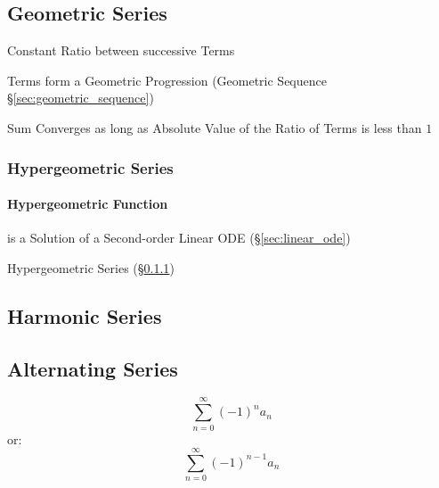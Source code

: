 \subsection{Geometric Series}\label{sec:geometric_series}

Constant Ratio between successive Terms

Terms form a Geometric Progression (Geometric Sequence
\S\ref{sec:geometric_sequence})

Sum Converges as long as Absolute Value of the Ratio of Terms is less
than $1$



\subsubsection{Hypergeometric Series}\label{sec:hypergeometric_series}

\paragraph{Hypergeometric Function}\label{sec:hypergeometric_function}\hfill

is a Solution of a Second-order Linear ODE (\S\ref{sec:linear_ode})

Hypergeometric Series (\S\ref{sec:hypergeometric_series})



\subsection{Harmonic Series}\label{sec:harmonic_series}

\subsection{Alternating Series}\label{sec:alternating_series}

\[
  \sum_{n=0}^\infty (-1)^n a_n
\]
or:
\[
  \sum_{n=0}^\infty (-1)^{n-1} a_n
\]



